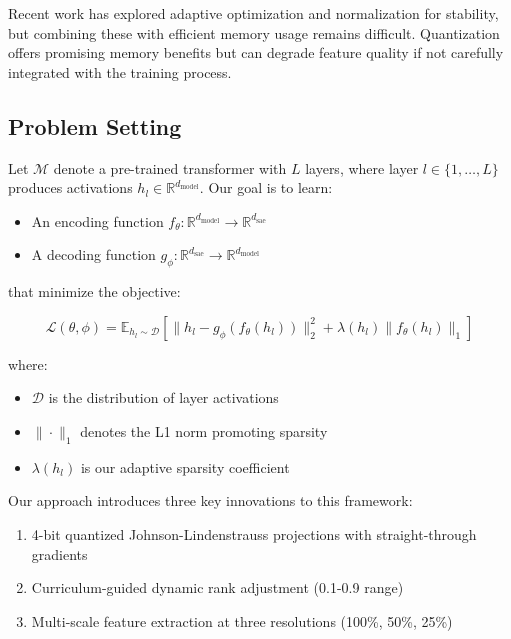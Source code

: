 \documentclass{article} %
\begin{document}
Recent work has explored adaptive optimization \cite{kingma2014adam} and normalization \cite{ba2016layer} for stability, but combining these with efficient memory usage remains difficult. Quantization offers promising memory benefits \cite{Han2015DeepCC} but can degrade feature quality if not carefully integrated with the training process.

\subsection{Problem Setting}
Let $\mathcal{M}$ denote a pre-trained transformer with $L$ layers, where layer $l \in \{1,\ldots,L\}$ produces activations $h_l \in \mathbb{R}^{d_{\text{model}}}$. Our goal is to learn:

\begin{itemize}
    \item An encoding function $f_{\theta}: \mathbb{R}^{d_{\text{model}}} \rightarrow \mathbb{R}^{d_{\text{sae}}}$ 
    \item A decoding function $g_{\phi}: \mathbb{R}^{d_{\text{sae}}} \rightarrow \mathbb{R}^{d_{\text{model}}}$
\end{itemize}

that minimize the objective:

\begin{equation}
\mathcal{L}(\theta,\phi) = \mathbb{E}_{h_l \sim \mathcal{D}} \left[\|h_l - g_{\phi}(f_{\theta}(h_l))\|_2^2 + \lambda(h_l)\|f_{\theta}(h_l)\|_1\right]
\end{equation}

where:
\begin{itemize}
    \item $\mathcal{D}$ is the distribution of layer activations
    \item $\|\cdot\|_1$ denotes the L1 norm promoting sparsity
    \item $\lambda(h_l)$ is our adaptive sparsity coefficient
\end{itemize}

Our approach introduces three key innovations to this framework:
\begin{enumerate}
    \item 4-bit quantized Johnson-Lindenstrauss projections with straight-through gradients
    \item Curriculum-guided dynamic rank adjustment (0.1-0.9 range)
    \item Multi-scale feature extraction at three resolutions (100\%, 50\%, 25\%)
\end{enumerate}
\end{document}
